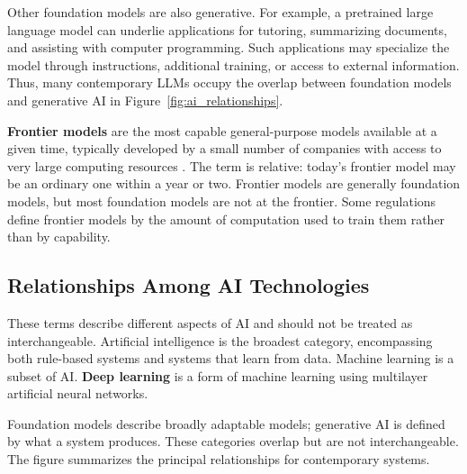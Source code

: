 \documentclass[11pt]{article}
\begin{document}
Other foundation models are also generative. For example, a
pretrained large language model can underlie applications for
tutoring, summarizing documents, and assisting with computer
programming. Such applications may specialize the model through
instructions, additional training, or access to external information.
Thus, many contemporary LLMs occupy the overlap between foundation
models and generative AI in Figure~\ref{fig:ai_relationships}.

\textbf{Frontier models} are the most capable general-purpose
models available at a given time, typically developed by a small
number of companies with access to very large computing resources
\citep{StanfordHAIFrontier}. The term is relative: today's frontier
model may be an ordinary one within a year or two. Frontier models
are generally foundation models, but most foundation models are not
at the frontier. Some regulations define frontier models by the
amount of computation used to train them rather than by capability.

\subsection{Relationships Among AI Technologies}

These terms describe different aspects of AI and should not be
treated as interchangeable. Artificial intelligence is the
broadest category, encompassing both rule-based systems and
systems that learn from data. Machine learning is a subset of
AI. \textbf{Deep learning} is a form of machine learning
using multilayer artificial neural networks.

Foundation models describe broadly adaptable models; generative AI
is defined by what a system produces. These categories overlap but
are not interchangeable. The figure summarizes the principal
relationships for contemporary systems.
\end{document}

